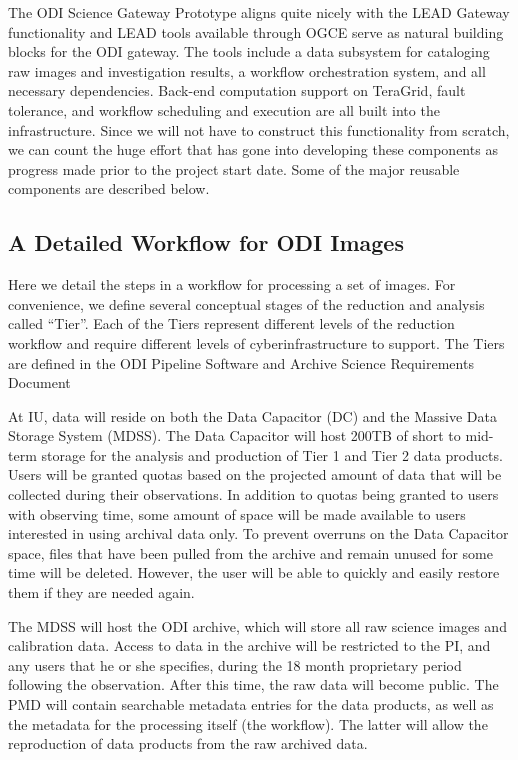\documentclass[10pt,conference]{IEEEtran}
\begin{document}
The ODI Science Gateway Prototype aligns quite nicely with the LEAD Gateway functionality and LEAD tools available through OGCE serve as natural building blocks for the ODI gateway. The tools include a data subsystem for cataloging raw images and investigation results, a workflow orchestration system, and all necessary dependencies. Back-end computation support on TeraGrid, fault tolerance, and workflow scheduling and execution are all built into the infrastructure. Since we will not have to construct this functionality from scratch, we can count the huge effort that has gone into developing these components as progress made prior to the project start date. Some of the major reusable components are described below.

\subsection{A Detailed Workflow for ODI Images}\label{sec:workflow}

Here we detail the steps in a workflow for processing a set of images. For convenience, we define several conceptual stages of the reduction and analysis called ``Tier''. Each of the Tiers represent different levels of the reduction workflow and require different levels of cyberinfrastructure to support. The Tiers are defined in the ODI Pipeline Software and Archive Science Requirements Document 



At IU, data will reside on both the Data Capacitor (DC) and the Massive Data Storage System (MDSS).
The Data Capacitor will host 200TB of short to mid-term storage for the analysis and production of Tier 1 and Tier 2 data products. Users will be granted quotas based on the projected amount of data that will be collected during their observations. In addition to quotas being granted to users with observing time, some amount of space will be made available to users interested in using archival data only. To prevent overruns on the Data Capacitor space, files that have been pulled from the archive and remain unused for some time will be deleted. However, the user will be able to quickly and easily restore them if they are needed again.

The MDSS will host the ODI archive, which will store all raw science images and calibration data.
Access to data in the archive will be restricted to the PI, and any users that he or she specifies, during the 18 month proprietary period following the observation. After this time, the raw data will become public. The PMD will contain searchable metadata entries for the data products, as well as the metadata for the processing itself (the workflow). The latter will allow the reproduction of data products from the raw archived data. 
\end{document}
